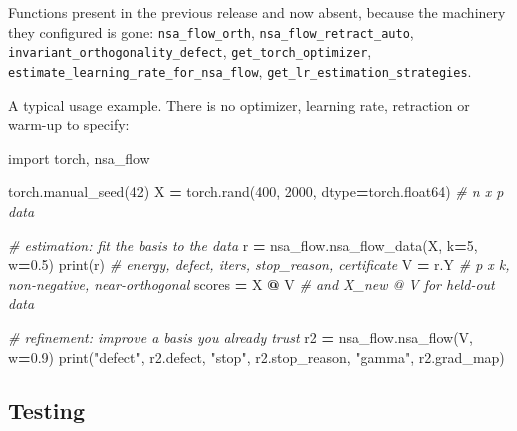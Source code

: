 \documentclass[
]{article}
\newenvironment{Shaded}{\begin{snugshade}}{\end{snugshade}}
\newcommand{\BuiltInTok}[1]{#1}
\newcommand{\CommentTok}[1]{\textcolor[rgb]{0.56,0.35,0.01}{\textit{#1}}}
\newcommand{\DecValTok}[1]{\textcolor[rgb]{0.00,0.00,0.81}{#1}}
\newcommand{\FloatTok}[1]{\textcolor[rgb]{0.00,0.00,0.81}{#1}}
\newcommand{\ImportTok}[1]{#1}
\newcommand{\NormalTok}[1]{#1}
\newcommand{\OperatorTok}[1]{\textcolor[rgb]{0.81,0.36,0.00}{\textbf{#1}}}
\newcommand{\StringTok}[1]{\textcolor[rgb]{0.31,0.60,0.02}{#1}}
\begin{document}
Functions present in the previous release and now absent, because the machinery
they configured is gone: \texttt{nsa\_flow\_orth}, \texttt{nsa\_flow\_retract\_auto},
\texttt{invariant\_orthogonality\_defect}, \texttt{get\_torch\_optimizer},
\texttt{estimate\_learning\_rate\_for\_nsa\_flow}, \texttt{get\_lr\_estimation\_strategies}.

A typical usage example. There is no optimizer, learning rate, retraction or
warm-up to specify:

\begin{Shaded}
\begin{Highlighting}[]
\ImportTok{import}\NormalTok{ torch, nsa\_flow}

\NormalTok{torch.manual\_seed(}\DecValTok{42}\NormalTok{)}
\NormalTok{X }\OperatorTok{=}\NormalTok{ torch.rand(}\DecValTok{400}\NormalTok{, }\DecValTok{2000}\NormalTok{, dtype}\OperatorTok{=}\NormalTok{torch.float64)      }\CommentTok{\# n x p data}

\CommentTok{\# estimation: fit the basis to the data}
\NormalTok{r }\OperatorTok{=}\NormalTok{ nsa\_flow.nsa\_flow\_data(X, k}\OperatorTok{=}\DecValTok{5}\NormalTok{, w}\OperatorTok{=}\FloatTok{0.5}\NormalTok{)}
\BuiltInTok{print}\NormalTok{(r)                     }\CommentTok{\# energy, defect, iters, stop\_reason, certificate}
\NormalTok{V }\OperatorTok{=}\NormalTok{ r.Y                      }\CommentTok{\# p x k, non{-}negative, near{-}orthogonal}
\NormalTok{scores }\OperatorTok{=}\NormalTok{ X }\OperatorTok{@}\NormalTok{ V               }\CommentTok{\# and X\_new @ V for held{-}out data}

\CommentTok{\# refinement: improve a basis you already trust}
\NormalTok{r2 }\OperatorTok{=}\NormalTok{ nsa\_flow.nsa\_flow(V, w}\OperatorTok{=}\FloatTok{0.9}\NormalTok{)}
\BuiltInTok{print}\NormalTok{(}\StringTok{"defect"}\NormalTok{, r2.defect, }\StringTok{"stop"}\NormalTok{, r2.stop\_reason, }\StringTok{"gamma"}\NormalTok{, r2.grad\_map)}
\end{Highlighting}
\end{Shaded}

\subsection{Testing}\label{testing}
\end{document}
